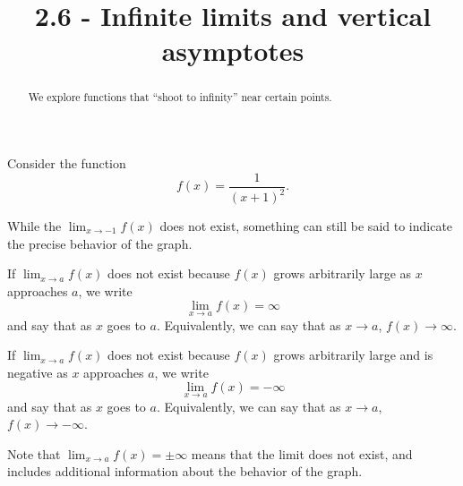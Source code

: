 \documentclass{ximera}
\title{2.6 - Infinite limits and vertical asymptotes}
\begin{document}
\begin{abstract}
We explore functions that ``shoot to infinity'' near certain points.

\end{abstract}
\maketitle

Consider the function
\[
f(x) = \frac{1}{(x+1)^2}.
\]
\begin{image}
\end{image}
While the $\lim_{x\to -1} f(x)$ does not exist, something can still be
said to indicate the precise behavior of the graph.

\begin{definition}\label{def:inflimit}
If $\displaystyle\lim_{x\rightarrow a}f(x)$ does not exist because $f(x)$ grows arbitrarily large as $x$ approaches $a$, we write
\[
\lim_{x\to a} f(x) = \infty
\]
and say that  as $x$
goes to $a$. Equivalently, we can say that as $x\rightarrow a$, $f(x)\rightarrow\infty$.

If $\displaystyle\lim_{x\rightarrow a}f(x)$ does not exist because $f(x)$ grows arbitrarily large and is negative as $x$ approaches $a$, we write
\[
\lim_{x\to a} f(x) = -\infty
\]
and say that 
as $x$ goes to $a$. Equivalently, we can say that as $x\rightarrow a$, $f(x)\rightarrow-\infty$. 

Note that $\displaystyle\lim_{x\rightarrow a}f(x)=\pm\infty$ means that the limit does not exist, and includes additional information about the behavior of the graph.
\end{definition}
\end{document}
